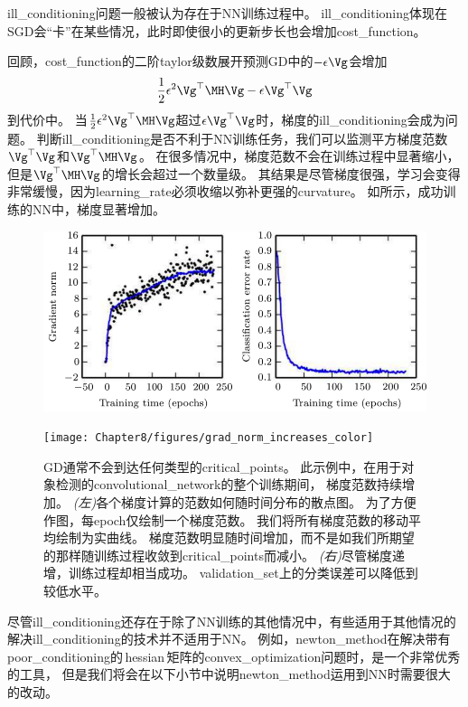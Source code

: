 \gls{ill_conditioning}问题一般被认为存在于\gls{NN}训练过程中。
\gls{ill_conditioning}体现在\gls{SGD}会``卡''在某些情况，此时即使很小的更新步长也会增加\gls{cost_function}。

回顾，\gls{cost_function}的二阶\gls{taylor}级数展开预测\gls{GD}中的$-\epsilon\Vg$会增加
\begin{equation}
    \frac{1}{2} \epsilon^2 \Vg^\top \MH\Vg - \epsilon\Vg^\top\Vg
\end{equation}
到代价中。
当$\frac{1}{2} \epsilon^2 \Vg^\top\MH\Vg$超过$\epsilon\Vg^\top\Vg$时，梯度的\gls{ill_conditioning}会成为问题。
判断\gls{ill_conditioning}是否不利于\gls{NN}训练任务，我们可以监测平方梯度范数$\Vg^\top\Vg$和$\Vg^\top \MH\Vg$。
在很多情况中，梯度范数不会在训练过程中显著缩小，但是$\Vg^\top\MH\Vg$的增长会超过一个数量级。
其结果是尽管梯度很强，学习会变得非常缓慢，因为\gls{learning_rate}必须收缩以弥补更强的\gls{curvature}。
如所示，成功训练的\gls{NN}中，梯度显著增加。

\begin{figure}[!htb]
\ifOpenSource
\centerline{\includegraphics[scale=0.5]{images/63.png}}
\else
\centerline{\texttt{[image: Chapter8/figures/grad\_norm\_increases\_color]}}
\fi
\caption{\gls{GD}通常不会到达任何类型的\gls{critical_points}。
此示例中，在用于对象检测的\gls{convolutional_network}的整个训练期间， 梯度范数持续增加。
\emph{(左)}各个梯度计算的范数如何随时间分布的散点图。
为了方便作图，每\gls{epoch}仅绘制一个梯度范数。 
我们将所有梯度范数的移动平均绘制为实曲线。
梯度范数明显随时间增加，而不是如我们所期望的那样随训练过程收敛到\gls{critical_points}而减小。
\emph{(右)}尽管梯度递增，训练过程却相当成功。 
\gls{validation_set}上的分类误差可以降低到较低水平。
}
\label{fig:chap8_grad_norm_increases}
\end{figure}


尽管\gls{ill_conditioning}还存在于除了\gls{NN}训练的其他情况中，有些适用于其他情况的解决\gls{ill_conditioning}的技术并不适用于\gls{NN}。
例如，\gls{newton_method}在解决带有\gls{poor_conditioning}的\,\gls{hessian}\,矩阵的\gls{convex_optimization}问题时，是一个非常优秀的工具，
但是我们将会在以下小节中说明\gls{newton_method}运用到\gls{NN}时需要很大的改动。


